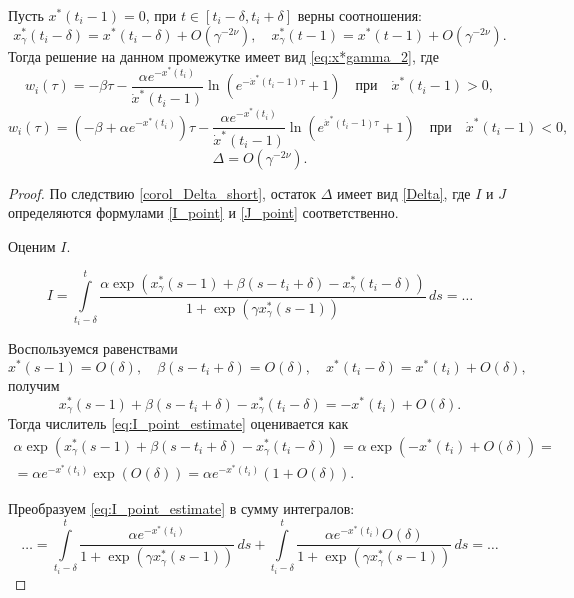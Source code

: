 \begin{lemma}
\label{lm:w}
	Пусть $x^*(t_i - 1) = 0$, при $t \in [t_i - \delta, t_i + \delta]$ верны соотношения:
	\[ x^*_{\gamma}(t_i - \delta) = x^*(t_i - \delta) + O(\gamma^{-2\nu}), \quad x^*_{\gamma}(t - 1) = x^*(t - 1) + O(\gamma^{-2\nu}).\]
	Тогда решение на данном промежутке имеет вид \eqref{eq:x*gamma_2}, где
	\[
	w_i(\tau) = -\beta \tau - \dfrac{\alpha e^{-x^*(t_i)}}{\dot{x}^*(t_i - 1)} \ln\left(e^{-\dot{x}^*(t_i - 1)\tau} + 1\right) \quad \text{при} \quad \dot{x}^*(t_i - 1) > 0,
	\]
	\[
	w_i(\tau) = (-\beta + \alpha e^{-x^*(t_i)})\tau - \dfrac{\alpha e^{-x^*(t_i)}}{\dot{x}^*(t_i - 1)} \ln\left(e^{\dot{x}^*(t_i - 1)\tau} + 1\right) \quad \text{при} \quad \dot{x}^*(t_i - 1) < 0,
	\]
	\[
	\Delta = O(\gamma^{-2\nu}).
	\]
\end{lemma}
%
\begin{proof}
	По следствию \ref{corol_Delta_short}, остаток $\Delta$ имеет вид \eqref{Delta}, где $I$ и $J$ определяются формулами \eqref{I_point} и \eqref{J_point} соответственно.
	
	Оценим $I$.
	
	\begin{equation}
	\label{eq:I_point_estimate}
	I = \int\limits_{t_i - \delta}^{t} \dfrac{\alpha \exp(x^*_{\gamma}(s - 1) + \beta(s - t_i + \delta) - x^*_{\gamma}(t_i - \delta))}{1 + \exp(\gamma x^*_{\gamma}(s - 1))}\, ds = \ldots
	\end{equation}
	
	Воспользуемся равенствами
	\[
	x^*(s - 1) = O(\delta), \quad \beta(s - t_i + \delta) = O(\delta), \quad x^*(t_i - \delta) = x^*(t_i) + O(\delta),
	\]
	получим
	\[
	x^*_{\gamma}(s - 1) + \beta(s - t_i + \delta) - x^*_{\gamma}(t_i - \delta) = -x^*(t_i) + O(\delta).
	\]
	Тогда числитель \eqref{eq:I_point_estimate} оценивается как
	\begin{multline*}
	\alpha \exp(x^*_{\gamma}(s - 1) + \beta(s - t_i + \delta) - x^*_{\gamma}(t_i - \delta)) = \alpha \exp(-x^*(t_i) + O(\delta)) =\\= \alpha e^{-x^*(t_i)} \exp(O(\delta)) = \alpha e^{-x^*(t_i)} (1 + O(\delta)).
	\end{multline*}
	
	Преобразуем \eqref{eq:I_point_estimate} в сумму интегралов:
	\[
	\ldots = \int\limits_{t_i - \delta}^{t} \dfrac{\alpha e^{-x^*(t_i)}}{1 + \exp(\gamma x^*_{\gamma}(s - 1))}\, ds + \int\limits_{t_i - \delta}^{t} \dfrac{\alpha e^{-x^*(t_i)} O(\delta)}{1 + \exp(\gamma x^*_{\gamma}(s - 1))} \, ds = \ldots
	\]
	

\end{proof}
